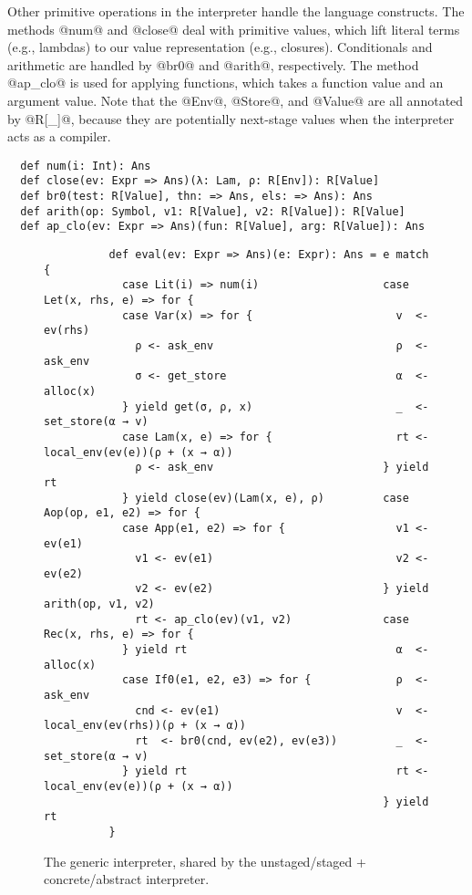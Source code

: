 Other primitive operations in the interpreter handle the language constructs.  The
methods @num@ and @close@ deal with primitive values, which lift literal terms
(e.g., lambdas) to our value representation (e.g., closures).
Conditionals and arithmetic are handled by @br0@ and @arith@, respectively. The
method @ap_clo@ is used for applying functions, which takes a function value
and an argument value. Note that the @Env@, @Store@, and @Value@ are all
annotated by @R[_]@, because they are potentially next-stage values when the
interpreter acts as a compiler.
\begin{lstlisting}
  def num(i: Int): Ans
  def close(ev: Expr => Ans)(λ: Lam, ρ: R[Env]): R[Value]
  def br0(test: R[Value], thn: => Ans, els: => Ans): Ans
  def arith(op: Symbol, v1: R[Value], v2: R[Value]): R[Value]
  def ap_clo(ev: Expr => Ans)(fun: R[Value], arg: R[Value]): Ans
\end{lstlisting}

\begin{figure}[t]
  \centering
  \begin{lstlisting}
          def eval(ev: Expr => Ans)(e: Expr): Ans = e match {
            case Lit(i) => num(i)                   case Let(x, rhs, e) => for {
            case Var(x) => for {                      v  <- ev(rhs)
              ρ <- ask_env                            ρ  <- ask_env
              σ <- get_store                          α  <- alloc(x)
            } yield get(σ, ρ, x)                      _  <- set_store(α → v)
            case Lam(x, e) => for {                   rt <- local_env(ev(e))(ρ + (x → α))
              ρ <- ask_env                          } yield rt
            } yield close(ev)(Lam(x, e), ρ)         case Aop(op, e1, e2) => for {
            case App(e1, e2) => for {                 v1 <- ev(e1)
              v1 <- ev(e1)                            v2 <- ev(e2)
              v2 <- ev(e2)                          } yield arith(op, v1, v2)
              rt <- ap_clo(ev)(v1, v2)              case Rec(x, rhs, e) => for {
            } yield rt                                α  <- alloc(x)
            case If0(e1, e2, e3) => for {             ρ  <- ask_env
              cnd <- ev(e1)                           v  <- local_env(ev(rhs))(ρ + (x → α))
              rt  <- br0(cnd, ev(e2), ev(e3))         _  <- set_store(α → v)
            } yield rt                                rt <- local_env(ev(e))(ρ + (x → α))
                                                    } yield rt
          }
  \end{lstlisting}
\vspace{-0.5em}
\caption{The generic interpreter,
  shared by the unstaged/staged + concrete/abstract interpreter.}
\vspace{-1.5em}
\label{fig:shared_int}
\end{figure}

